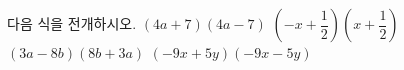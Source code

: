 다음 식을 전개하시오.
 $(4a+7)(4a-7)$
 $\left(-x+\dfrac{1}{2}\right)\left(x+\dfrac{1}{2}\right)$
 $(3a-8b)(8b+3a)$
 $(-9x+5y)(-9x-5y)$
